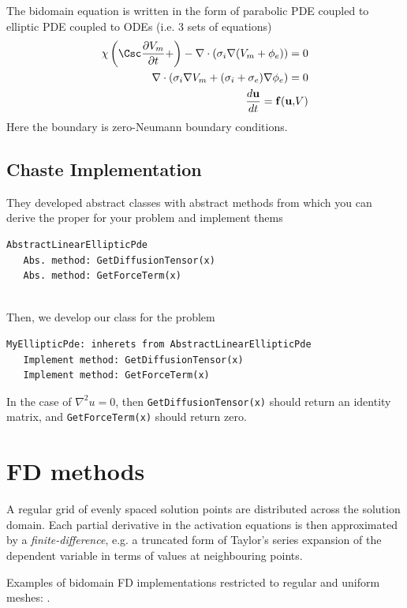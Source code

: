 The bidomain equation is written in the form of parabolic PDE coupled to
elliptic PDE coupled to ODEs (i.e. 3 sets of equations)
\begin{equation}
\begin{split}
\chi \left( \Csc \frac{\partial V_m}{\partial t} +  \right) - \nabla \cdot
\left( \sigma_i \nabla (V_m + \phi_e) \right) = 0 \\
\nabla \cdot \left( \sigma_i \nabla V_m + (\sigma_i + \sigma_e ) \nabla \phi_e
\right) = 0 \\
\frac{d\mathbf{u}}{dt} = \mathbf{f(u,}V)
\end{split}
\end{equation}
Here the boundary is zero-Neumann boundary conditions.
												


\subsection{Chaste Implementation}

They developed abstract classes with abstract methods from which you can derive
the proper for your problem and implement thems
\begin{verbatim}
AbstractLinearEllipticPde
   Abs. method: GetDiffusionTensor(x)
   Abs. method: GetForceTerm(x)
   
\end{verbatim}

Then, we develop our class for the problem 
\begin{verbatim}
MyEllipticPde: inherets from AbstractLinearEllipticPde
   Implement method: GetDiffusionTensor(x)
   Implement method: GetForceTerm(x)
\end{verbatim}
In the case of $\nabla^2u = 0$, then \verb!GetDiffusionTensor(x)! should return
an identity matrix, and \verb!GetForceTerm(x)! should return zero.
 
\section{FD methods}

A regular grid of evenly spaced solution points are distributed across the
solution domain. Each partial derivative in the activation equations is then
approximated by a {\it finite-difference}, e.g. a truncated form of Taylor's
series expansion of the dependent variable in terms of values at neighbouring
points.

Examples of bidomain FD implementations restricted to regular and uniform
meshes: \citep{Latimer1998, Quan1998, Skouibine1999}. 


